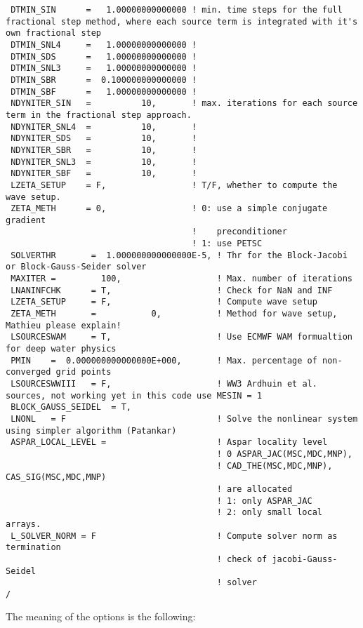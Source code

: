 \documentclass[12pt]{amsart}
\begin{document}
\begin{verbatim}
 DTMIN_SIN      =   1.00000000000000 ! min. time steps for the full fractional step method, where each source term is integrated with it's own fractional step
 DTMIN_SNL4     =   1.00000000000000 !    
 DTMIN_SDS      =   1.00000000000000 !    
 DTMIN_SNL3     =   1.00000000000000 !   
 DTMIN_SBR      =  0.100000000000000 !    
 DTMIN_SBF      =   1.00000000000000 !    
 NDYNITER_SIN   =          10,       ! max. iterations for each source term in the fractional step approach. 
 NDYNITER_SNL4  =          10,       !
 NDYNITER_SDS   =          10,       !
 NDYNITER_SBR   =          10,       !
 NDYNITER_SNL3  =          10,       ! 
 NDYNITER_SBF   =          10,       !
 LZETA_SETUP    = F,                 ! T/F, whether to compute the wave setup.
 ZETA_METH      = 0,                 ! 0: use a simple conjugate gradient
                                     !    preconditioner
                                     ! 1: use PETSC
 SOLVERTHR       =  1.000000000000000E-5, ! Thr for the Block-Jacobi or Block-Gauss-Seider solver
 MAXITER =         100,                   ! Max. number of iterations 
 LNANINFCHK      = T,                     ! Check for NaN and INF
 LZETA_SETUP     = F,                     ! Compute wave setup 
 ZETA_METH       =           0,           ! Method for wave setup, Mathieu please explain!
 LSOURCESWAM     = T,                     ! Use ECMWF WAM formualtion for deep water physics 
 PMIN    =  0.000000000000000E+000,       ! Max. percentage of non-converged grid points 
 LSOURCESWWIII   = F,                     ! WW3 Ardhuin et al. sources, not working yet in this code use MESIN = 1 
 BLOCK_GAUSS_SEIDEL  = T,
 LNONL   = F                              ! Solve the nonlinear system using simpler algorithm (Patankar) 
 ASPAR_LOCAL_LEVEL =                      ! Aspar locality level
                                          ! 0 ASPAR_JAC(MSC,MDC,MNP),
                                          ! CAD_THE(MSC,MDC,MNP), CAS_SIG(MSC,MDC,MNP)
                                          ! are allocated
                                          ! 1: only ASPAR_JAC
                                          ! 2: only small local arrays.
 L_SOLVER_NORM = F                        ! Compute solver norm as termination
                                          ! check of jacobi-Gauss-Seidel
                                          ! solver
/
\end{verbatim}
The meaning of the options is the following:
\end{document}

